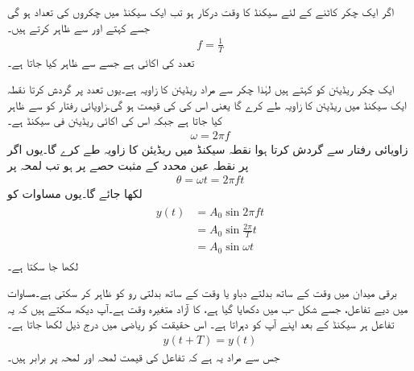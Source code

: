 اگر ایک چکر کاٹنے کے لئے  سیکنڈ کا وقت درکار ہو تب ایک سیکنڈ میں چکروں کی تعداد   ہو گی جسے  کہتے اور  سے ظاہر کرتے ہیں۔
\begin{align}
f=\frac{1}{T}
\end{align}
تعدد کی اکائی  ہے جسے  سے ظاہر کیا جاتا ہے۔

ایک چکر  ریڈیئن کو کہتے ہیں لہٰذا  چکر سے مراد  ریڈیئن کا زاویہ ہے۔یوں  تعدد پر گردش کرتا نقطہ ایک سیکنڈ میں  ریڈیئن کا زاویہ طے کرے گا یعنی اس کی  کی قیمت  ہو گی۔زاویائی رفتار کو  سے ظاہر کیا جاتا ہے جبکہ اس کی اکائی ریڈیئن فی سیکنڈ  ہے۔
\begin{align}
\omega=2\pi f
\end{align}
زاویائی رفتار  سے گردش کرتا ہوا نقطہ  سیکنڈ میں  ریڈیئن کا زاویہ طے کرے گا۔یوں اگر  پر نقطہ عین  محدد کے مثبت حصے پر ہو تب لمحہ  پر
\begin{align}
\theta=\omega t=2\pi f t
\end{align}
لکھا جائے گا۔یوں مساوات   کو
\begin{gather}
\begin{aligned}\label{مساوات_بدلتا_سائن_نما_تفاعل_ب}
y(t)&=A_0 \sin 2\pi f t\\
&=A_0\sin \frac{2\pi}{T}t\\
&=A_0 \sin \omega t
\end{aligned}
\end{gather}
لکھا جا سکتا ہے۔

برقی میدان میں  وقت کے ساتھ بدلتے دباو یا وقت کے ساتھ بدلتی رو کو ظاہر کر سکتی ہے۔مساوات  میں دیے تفاعل، جسے شکل -ب میں دکھایا گیا ہے،  کا آزاد متغیرہ وقت  ہے۔آپ دیکھ سکتے ہیں کہ یہ تفاعل ہر  سیکنڈ کے بعد اپنے آپ کو دہراتا ہے۔ اس حقیقت کو ریاضی میں درج ذیل لکھا جاتا ہے۔
\begin{align}
y(t+T)=y( t)
\end{align}
جس سے مراد یہ ہے کہ تفاعل کی قیمت لمحہ  اور لمحہ  پر برابر ہیں۔

